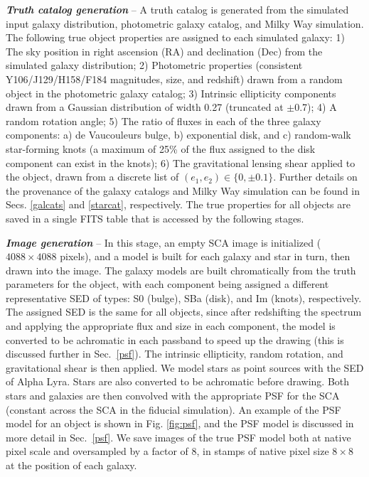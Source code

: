 \documentclass[usenatbib]{mnras}
\begin{document}
\textbf{\textit{Truth catalog generation}} -- A truth catalog is generated from the simulated input galaxy distribution, photometric galaxy catalog, and Milky Way simulation. 
The following true object properties are assigned to each simulated galaxy:
1) The sky position in right ascension (RA) and declination (Dec) from the simulated galaxy distribution; 
2) Photometric properties (consistent Y106/J129/H158/F184 magnitudes, size, and redshift) drawn from a random object in the photometric galaxy catalog; 
3) Intrinsic ellipticity components drawn from a Gaussian distribution of width 0.27 (truncated at $\pm$0.7); 
4) A random rotation angle; 
5) The ratio of fluxes in each of the three galaxy components: a) de Vaucouleurs bulge, b) exponential disk, and c) random-walk star-forming knots (a maximum of 25\% of the flux assigned to the disk component can exist in the knots); 
6) The gravitational lensing shear applied to the object, drawn from a discrete list of $(e_1, e_2) \in \{0,\pm 0.1\}$.
Further details on the provenance of the galaxy catalogs and Milky Way simulation can be found in Secs. \ref{galcats} and \ref{starcat}, respectively. 
The true properties for all objects are saved in a single FITS table that is accessed by the following stages.

\textbf{\textit{Image generation}} -- In this stage, an empty SCA image is initialized ($4088\times4088$ pixels), and a model is built for each galaxy and star in turn, then drawn into the image. 
The galaxy models are built chromatically from the truth parameters for the object, with each component being assigned a different representative SED of types: S0 (bulge), SBa (disk), and Im (knots), respectively. 
The assigned SED is the same for all objects, since after redshifting the spectrum and applying the appropriate flux and size in each component, the model is converted to be achromatic in each passband to speed up the drawing (this is discussed further in Sec.~\ref{psf}). 
The intrinsic ellipticity, random rotation, and gravitational shear is then applied.
We model stars as point sources with the SED of Alpha Lyra.
Stars are also converted to be achromatic before drawing.
Both stars and galaxies are then convolved with the appropriate PSF for the SCA (constant across the SCA in the fiducial simulation). An example of the PSF model for an object is shown in Fig. \ref{fig:psf}, and the PSF model is discussed in more detail in Sec.~\ref{psf}. We save images of the true PSF model both at native pixel scale and oversampled by a factor of 8, in stamps of native pixel size $8\times 8$ at the position of each galaxy.
\end{document}
